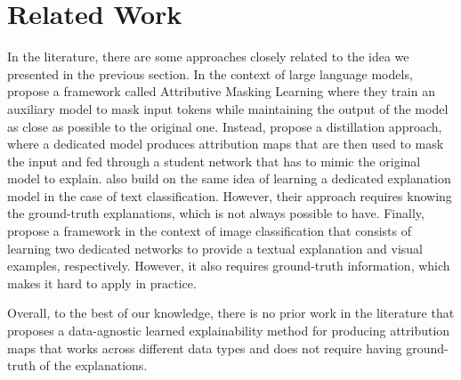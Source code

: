 \section{Related Work}

In the literature, there are some approaches closely related to the idea we presented in the previous section.
In the context of large language models, \citeauthor{barkan-etal-2024-llm} \cite{barkan-etal-2024-llm} propose a framework called Attributive Masking Learning where they train an auxiliary model to mask input tokens while maintaining the output of the model as close as possible to the original one.
Instead, \citeauthor{bhattacharya2024gradientfreeposthocexplainabilityusing} \cite{bhattacharya2024gradientfreeposthocexplainabilityusing} propose a distillation approach, where a dedicated model produces attribution maps that are then used to mask the input and fed through a student network that has to mimic the original model to explain.
\citeauthor{liu2019explainablenlpgenerativeexplanation} \cite{liu2019explainablenlpgenerativeexplanation} also build on the same idea of learning a dedicated explanation model in the case of text classification. However, their approach requires knowing the ground-truth explanations, which is not always possible to have.
Finally, \citeauthor{kanehira2019learningexplaincomplementalexamples} \cite{kanehira2019learningexplaincomplementalexamples} propose a framework in the context of image classification that consists of learning two dedicated networks to provide a textual explanation and visual examples, respectively. However, it also requires ground-truth information, which makes it hard to apply in practice.

Overall, to the best of our knowledge, there is no prior work in the literature that proposes a data-agnostic learned explainability method for producing attribution maps that works across different data types and does not require having ground-truth of the explanations.
